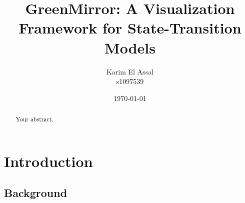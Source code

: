 \documentclass[a4paper]{article}
\title{GreenMirror: A Visualization Framework for State-Transition Models}
\author{Karim El Assal \\ s1097539}
\date{\today}
\begin{document}
	
	
	
	
	\maketitle
	
	\begin{abstract}
		Your abstract.
	\end{abstract}
	
	\newpage
	\tableofcontents
	
	\newpage
	
	
	
	
	\section{Introduction}
	
	\subsection{Background}\label{subsec:background}
	
\end{document}
